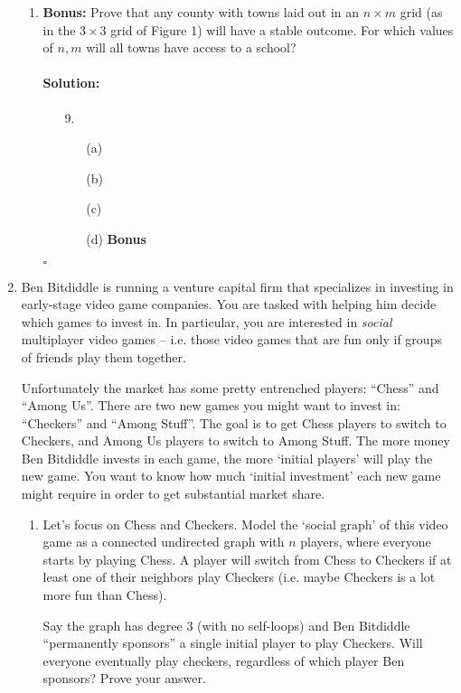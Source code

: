 \documentclass[11pt,letterpaper]{article}
\newif \iftemplate \templatetrue
\newenvironment{solution}{\paragraph{Solution:}}{\hfill$\square$}
\theoremstyle{definition}
\begin{document}
\begin{enumerate}
\begin{enumerate}
\item \textbf{Bonus:} Prove that any county with towns laid out in an $n \times m$ grid (as in the $3\times 3$ grid of Figure 1) will have a stable outcome. For which values of $n,m$ will all towns have access to a school?

\iftemplate
\begin{solution}
\begin{enumerate}
\item[9.]
\begin{enumerate}
\item[(a)]
\item[(b)]
\item[(c)]
\item[(d)] \textbf{Bonus}
\end{enumerate}
\end{enumerate}
\end{solution}
\newpage
\fi




\end{enumerate}

\item Ben Bitdiddle is running a venture capital firm that specializes in investing in early-stage video game companies. You are tasked with helping him decide which games to invest in. In particular, you are interested in \textit{social} multiplayer video games -- i.e. those video games that are fun only if groups of friends play them together.

Unfortunately the market has some pretty entrenched players: ``Chess'' and ``Among Us''. There are two new games you might want to invest in: ``Checkers'' and ``Among Stuff''. The goal is to get Chess players to switch to Checkers, and Among Us players to switch to Among Stuff. The more money Ben Bitdiddle invests in each game, the more `initial players' will play the new game. You want to know how much `initial investment' each new game might require in order to get substantial market share.

\begin{enumerate}
\item  Let's focus on Chess and Checkers. Model the `social graph' of this video game as a connected undirected graph with $n$ players, where everyone starts by playing Chess. A player will switch from Chess to Checkers if at least one of their neighbors play Checkers (i.e. maybe Checkers is a lot more fun than Chess).

Say the graph has degree $3$ (with no self-loops) and Ben Bitdiddle ``permanently sponsors'' a single initial player to play Checkers. Will everyone eventually play checkers, regardless of which player Ben sponsors? Prove your answer.



\end{enumerate}
\end{enumerate}
\end{document}
